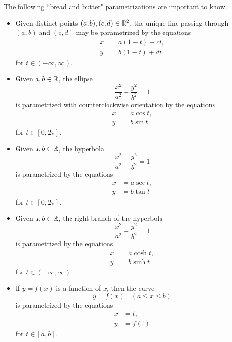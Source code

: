 \newpage

\begin{remark}
The following ``bread and butter" parametrizations are important to know.
\begin{itemize}
\item
Given distinct points $(a,b), (c,d)\in\mathbb R^2$, the unique line passing through $(a,b)$ and $(c,d)$ may be parametrized by the equations
\begin{align*}
x & = a(1-t) + ct,\\
y &=  b(1-t) + dt
\end{align*}
for $t\in (-\infty, \infty)$.
\item
Given $a, b\in \mathbb R$, the ellipse
\begin{equation*}
\frac{x^2}{a^2}+\frac{y^2}{b^2}=1
\end{equation*}
is parametrized with counterclockwise orientation by the equations
\begin{align*}
x & = a\cos t,\\
y &= b\sin t
\end{align*}
for $t\in [0,2\pi]$.
\item
Given $a, b\in \mathbb R$, the hyperbola
\begin{equation*}
\frac{x^2}{a^2}-\frac{y^2}{b^2}=1
\end{equation*}
is parametrized by the equations
\begin{align*}
x & = a\sec t,\\
y &= b\tan t
\end{align*}
for $t\in [0,2\pi]$.
\item
Given $a, b\in \mathbb R$, the right branch of the hyperbola
\begin{equation*}
\frac{x^2}{a^2}-\frac{y^2}{b^2}=1
\end{equation*}
is parametrized by the equations
\begin{align*}
x & = a\cosh t,\\
y &= b\sinh t
\end{align*}
for $t\in (-\infty,\infty)$.
\item If $y=f(x)$ is a function of $x$, then the curve
\begin{equation*}
y=f(x)\quad (a\le x\le b)
\end{equation*}
is parametrized by the equations
\begin{align*}
x &= t,\\
y &=f(t)
\end{align*}
for $t\in [a,b]$.
\end{itemize}
\end{remark}

